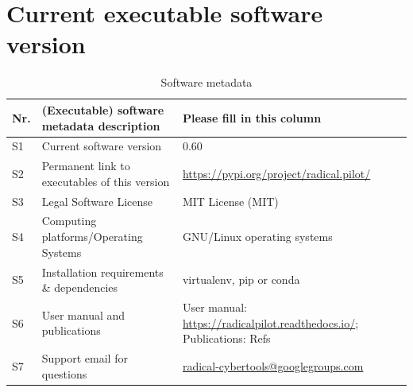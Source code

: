 \documentclass[preprint,12pt, a4paper]{elsarticle}
\begin{document}
\section*{Current executable software version}\label{sec:bin_version}


\begin{table}[!ht]
\begin{tabular}{|l|p{6.5cm}|p{6.5cm}|}
\hline
\textbf{Nr.}                                                     & 
\textbf{(Executable) software metadata description}              & 
\textbf{Please fill in this column}                              \\
\hline
%
S1                                                               & 
Current software version                                         & 
0.60                                                             \\
\hline
%
S2                                                               & 
Permanent link to executables of this version                    & 
\url{https://pypi.org/project/radical.pilot/}                    \\
\hline
%
S3                                                               & 
Legal Software License                                           & 
MIT License (MIT)                                                \\
\hline
%
S4                                                               & 
Computing platforms/Operating Systems                            & 
GNU/Linux operating systems                                      \\
\hline
%
S5                                                               & 
Installation requirements \& dependencies                        & 
virtualenv, pip or conda                                         \\
\hline
%
S6                                                               & 
User manual and publications                                     & 
User manual: \url{https://radicalpilot.readthedocs.io/}; 
Publications: Refs~\cite{}                                       \\
\hline
%
S7                                                               & 
Support email for questions                                      & 
\url{radical-cybertools@googlegroups.com}                        \\
\hline
\end{tabular}
\caption{Software metadata}
\label{tab:bin_metadata} 
\end{table}
\end{document}
